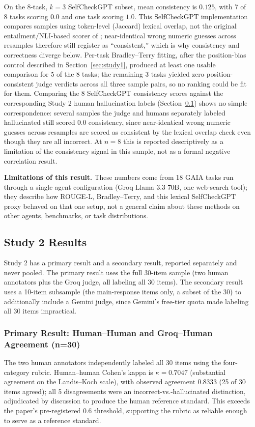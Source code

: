 \documentclass[conference]{IEEEtran}
\begin{document}
On the 8-task, $k=3$ SelfCheckGPT subset, mean consistency is $0.125$, with 7 of 8 tasks scoring $0.0$ and one task scoring $1.0$. This SelfCheckGPT implementation compares samples using token-level (Jaccard) lexical overlap, not the original entailment/NLI-based scorer of \cite{manakul2023selfcheckgpt}; near-identical wrong numeric guesses across resamples therefore still register as ``consistent,'' which is why consistency and correctness diverge below. Per-task Bradley--Terry fitting, after the position-bias control described in Section~\ref{sec:study1}, produced at least one usable comparison for 5 of the 8 tasks; the remaining 3 tasks yielded zero position-consistent judge verdicts across all three sample pairs, so no ranking could be fit for them. Comparing the 8 SelfCheckGPT consistency scores against the corresponding Study 2 human hallucination labels (Section~\ref{sec:study2-results}) shows no simple correspondence: several samples the judge and humans separately labeled hallucinated still scored $0.0$ consistency, since near-identical wrong numeric guesses across resamples are scored as consistent by the lexical overlap check even though they are all incorrect. At $n=8$ this is reported descriptively as a limitation of the consistency signal in this sample, not as a formal negative correlation result.

\textbf{Limitations of this result.} These numbers come from 18 GAIA tasks run through a single agent configuration (Groq Llama 3.3 70B, one web-search tool); they describe how ROUGE-L, Bradley--Terry, and this lexical SelfCheckGPT proxy behaved on that one setup, not a general claim about these methods on other agents, benchmarks, or task distributions.

\subsection{Study 2 Results}
\label{sec:study2-results}
Study 2 has a primary result and a secondary result, reported separately and never pooled. The primary result uses the full 30-item sample (two human annotators plus the Groq judge, all labeling all 30 items). The secondary result uses a 10-item subsample (the main-response items only, a subset of the 30) to additionally include a Gemini judge, since Gemini's free-tier quota made labeling all 30 items impractical.

\subsubsection{Primary Result: Human--Human and Groq--Human Agreement (n=30)}
The two human annotators independently labeled all 30 items using the four-category rubric. Human--human Cohen's kappa is $\kappa=0.7047$ (substantial agreement on the Landis--Koch scale), with observed agreement $0.8333$ (25 of 30 items agreed); all 5 disagreements were an incorrect-vs.-hallucinated distinction, adjudicated by discussion to produce the human reference standard. This exceeds the paper's pre-registered $0.6$ threshold, supporting the rubric as reliable enough to serve as a reference standard.
\end{document}
